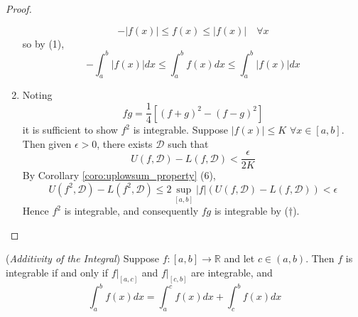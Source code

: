 \documentclass[10pt, a4paper, twoside]{report}
\begin{document}
\begin{proof}
\begin{enumerate}
        \[-|f(x)|\leq f(x)\leq|f(x)|\quad\forall x\]
        so by (1),
        \[-\int_a^b|f(x)|dx\leq\int_a^bf(x)dx\leq\int_a^b|f(x)|dx\]
        \item Noting
        \[fg=\frac 14\left[(f+g)^2-(f-g)^2\right]\tag{\(\dagger\)}\]
        it is sufficient to show \(f^2\) is integrable. Suppose \(|f(x)|\leq K\) \(\forall x\in[a,b]\). Then given \(\epsilon>0\), there exists \(\mathcal{D}\) such that 
        \[U(f,\mathcal{D})-L(f,\mathcal{D})<\frac{\epsilon}{2K}\]
        By Corollary \ref{coro:uplowsum_property} (6),
        \[U(f^2,\mathcal{D})-L(f^2,\mathcal{D})\leq 2\sup_{[a,b]}|f|(U(f,\mathcal{D})-L(f,\mathcal{D}))<\epsilon\]
        Hence \(f^2\) is integrable, and consequently \(fg\) is integrable by (\(\dagger\)).
    \end{enumerate}
\end{proof}
\begin{theorem}
    (\emph{Additivity of the Integral}) Suppose \(f:[a,b]\to\mathbb{R}\) and let \(c\in(a,b)\). Then \(f\) is integrable if and only if \(\left. f\right|_{[a,c]}\) and \(\left. f\right|_{[c,b]}\) are integrable, and 
    \[\int_a^bf(x)dx=\int_a^cf(x)dx+\int_c^bf(x)dx\]
    \label{thm:integral_add}
\end{theorem}
\end{document}
